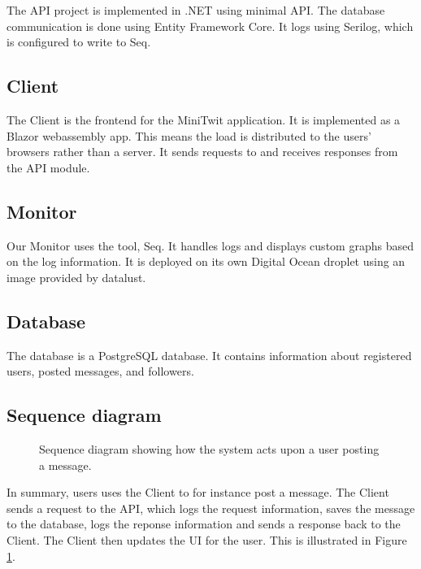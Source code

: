 The API project is implemented in .NET using minimal API.
The database communication is done using Entity Framework Core.
It logs using Serilog\cite{serilog}, 
which is configured to write to Seq\cite{seq}.

\subsection{Client}

The Client is the frontend for the MiniTwit application.
It is implemented as a Blazor webassembly app.
This means the load is distributed to the users' browsers 
rather than a server.
It sends requests to and receives responses from the API module.

\subsection{Monitor}

Our Monitor uses the tool, Seq\cite{seq}.
It handles logs and displays custom graphs based on 
the log information. 
It is deployed on its own Digital Ocean droplet 
using an image provided by datalust\cite{seq}.

\subsection{Database}

The database is a PostgreSQL\cite{postgres} database.
It contains information about registered users,
posted messages, and followers.

\subsection{Sequence diagram}

\begin{figure}[H]
    \centering
    
    \caption{Sequence diagram showing how the system acts upon 
    a user posting a message.}
    \label{fig:seq_diagram}
\end{figure}

In summary, users uses the Client to for instance post a message.
The Client sends a request to the API, which logs the request 
information, saves the message to the database, 
logs the reponse information and sends a response back to the 
Client. The Client then updates the UI for the user.
This is illustrated in Figure \ref{fig:seq_diagram}.
